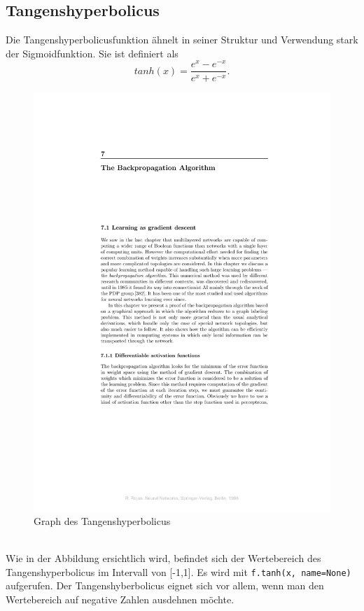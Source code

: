 \subsection{Tangenshyperbolicus}
Die Tangenshyperbolicusfunktion ähnelt in seiner Struktur und Verwendung stark der Sigmoidfunktion. Sie ist definiert als \cite{Bishop1995}
\begin{equation}
tanh(x)=\frac{e^x - e^{-x}}{e^x + e^{-x}}.
\end{equation}
\begin{figure}[!htp]
	\includegraphics[page=3,trim = 10.3cm 22cm 5cm 4.7cm,clip=true,scale=1.4]{images/BackPropRojas.pdf}
	\centering
	\caption{Graph des Tangenshyperbolicus \cite{Rojas1996}}
\end{figure}\\
Wie in der Abbildung ersichtlich wird, befindet sich der Wertebereich des Tangenshyperbolicus im Intervall von [-1,1]. Es wird mit \lstinline$f.tanh(x, name=None)$\cite{building} aufgerufen. Der Tangenshyberbolicus eignet sich vor allem, wenn man den Wertebereich auf negative Zahlen ausdehnen möchte.\cite{cookbook}
